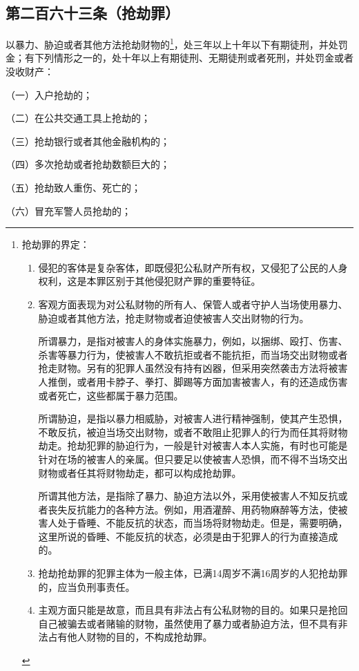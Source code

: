 \documentclass[utf-8,10pt]{ctexart}%
\begin{document}
\subsection{第二百六十三条（抢劫罪）}
以暴力、胁迫或者其他方法抢劫财物的\footnote{
抢劫罪的界定：
\begin{enumerate}
\item 侵犯的客体是复杂客体，即既侵犯公私财产所有权，又侵犯了公民的人身权利，这是本罪区别于其他侵犯财产罪的重要特征。
\item 客观方面表现为对公私财物的所有人、保管人或者守护人当场使用暴力、胁迫或者其他方法，抢走财物或者迫使被害人交出财物的行为。
    
    所谓暴力，是指对被害人的身体实施暴力，例如，以捆绑、殴打、伤害、杀害等暴力行为，使被害人不敢抗拒或者不能抗拒，而当场交出财物或者抢走财物。另有的犯罪人虽然没有持有凶器，但采用突然袭击方法将被害人推倒，或者用卡脖子、拳打、脚踢等方面加害被害人，有的还造成伤害或者死亡，这些都属于暴力范围。
    
    所谓胁迫，是指以暴力相威胁，对被害人进行精神强制，使其产生恐惧，不敢反抗，被迫当场交出财物，或者不敢阻止犯罪人的行为而任其将财物劫走。抢劫犯罪的胁迫行为，一般是针对被害人本人实施，有时也可能是针对在场的被害人的亲属。但只要足以使被害人恐惧，而不得不当场交出财物或者任其将财物劫走，都可以构成抢劫罪。
    
    所谓其他方法，是指除了暴力、胁迫方法以外，采用使被害人不知反抗或者丧失反抗能力的各种方法。例如，用酒灌醉、用药物麻醉等方法，使被害人处于昏睡、不能反抗的状态，而当场将财物劫走。但是，需要明确，这里所说的昏睡、不能反抗的状态，必须是由于犯罪人的行为直接造成的。
\item 抢劫抢劫罪的犯罪主体为一般主体，已满14周岁不满16周岁的人犯抢劫罪的，应当负刑事责任。
\item 主观方面只能是故意，而且具有非法占有公私财物的目的。如果只是抢回自己被骗去或者赌输的财物，虽然使用了暴力或者胁迫方法，但不具有非法占有他人财物的目的，不构成抢劫罪。
\end{enumerate}
}，处三年以上十年以下有期徒刑，并处罚金；有下列情形之一的，处十年以上有期徒刑、无期徒刑或者死刑，并处罚金或者没收财产：

（一）入户抢劫的；

（二）在公共交通工具上抢劫的；

（三）抢劫银行或者其他金融机构的；

（四）多次抢劫或者抢劫数额巨大的；

（五）抢劫致人重伤、死亡的；

（六）冒充军警人员抢劫的；
\end{document}
